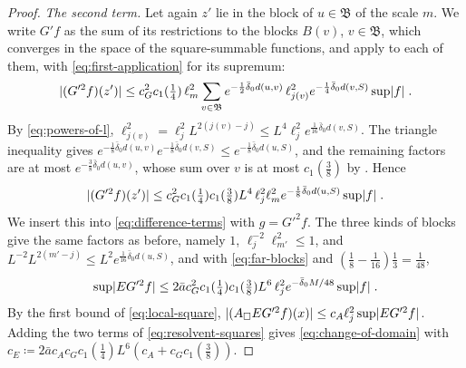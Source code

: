 \documentclass[11pt]{preprint}
\DeclarePairedDelimiter{\abs}{\lvert}{\rvert}
\numberwithin{equation}{section}
\theoremstyle{definition}
\theoremstyle{remark}
\theoremstyle{plain}
\begin{document}
\begin{proof}
\emph{The second term.} Let again $z'$ lie in the block of $u \in \mathfrak B$ of the scale $m$. We write $G'f$ as the sum of its restrictions to the blocks $B(v)$, $v \in \mathfrak B$, which converges in the space of the square-summable functions, and apply \cite[(2.67)]{BalabanPRT2} to each of them, with \eqref{eq:first-application} for its supremum:
\begin{equation}\label{eq:second-application}
    \abs{(G'^2f)(z')} \leq c_G^2c_1(\tfrac14)\,\ell_m^2\sum_{v \in \mathfrak B}e^{-\frac12\bar\delta_0d(u, v)}\,\ell_{j(v)}^2e^{-\frac14\bar\delta_0d(v, S)}\sup\abs f\;.
\end{equation}
By \eqref{eq:powers-of-l}, $\ell_{j(v)}^2 = \ell_j^2L^{2(j(v) - j)} \leq L^4\ell_j^2e^{\frac{1}{16}\bar\delta_0d(v, S)}$. The triangle inequality gives $e^{-\frac18\bar\delta_0d(u, v)}e^{-\frac18\bar\delta_0d(v, S)} \leq e^{-\frac18\bar\delta_0d(u, S)}$, and the remaining factors are at most $e^{-\frac38\bar\delta_0d(u, v)}$, whose sum over $v$ is at most $c_1(\frac38)$ by \cite[(2.61)]{BalabanPRT2}. Hence
\begin{equation}\label{eq:second-application-bound}
    \abs{(G'^2f)(z')} \leq c_G^2c_1(\tfrac14)c_1(\tfrac38)L^4\,\ell_j^2\ell_m^2e^{-\frac18\bar\delta_0d(u, S)}\sup\abs f\;.
\end{equation}
We insert this into \eqref{eq:difference-terms} with $g = G'^2f$. The three kinds of blocks give the same factors as before, namely $1$, $\ell_j^{-2}\ell_{m'}^2 \leq 1$, and $L^{-2}L^{2(m' - j)} \leq L^2e^{\frac{1}{16}\bar\delta_0d(u, S)}$, and with \eqref{eq:far-blocks} and $(\frac18 - \frac{1}{16})\frac13 = \frac{1}{48}$,
\begin{equation}\label{eq:second-term}
    \sup\abs{EG'^2f} \leq 2\bar ac_G^2c_1(\tfrac14)c_1(\tfrac38)L^6\,\ell_j^2e^{-\bar\delta_0M/48}\sup\abs f\;.
\end{equation}
By the first bound of \eqref{eq:local-square}, $\abs{(A_\square EG'^2f)(x)} \leq c_A\ell_j^2\sup\abs{EG'^2f}$. Adding the two terms of \eqref{eq:resolvent-squares} gives \eqref{eq:change-of-domain} with $c_E \coloneqq 2\bar ac_Ac_Gc_1(\frac14)L^6(c_A + c_Gc_1(\frac38))$.
\end{proof}
\end{document}
